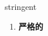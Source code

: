 
\begin{frame}
{\huge stringent}
\begin{center}
\begin{enumerate}\Large
  \item \textbf{严格的}
\end{enumerate}
\end{center}
\end{frame}
